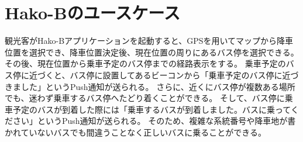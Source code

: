 \documentclass[openany,11pt,papersize]{jsbook}
\begin{document}
\section{Hako-Bのユースケース}
観光客がHako-Bアプリケーションを起動すると、GPSを用いてマップから降車位置を選択でき、降車位置決定後、現在位置の周りにあるバス停を選択できる。
その後、現在位置から乗車予定のバス停までの経路表示をする。
乗車予定のバス停に近づくと、バス停に設置してあるビーコンから「乗車予定のバス停に近づきました」というPush通知が送られる。
さらに、近くにバス停が複数ある場所でも、迷わず乗車するバス停へたどり着くことができる。
そして、バス停に乗車予定のバスが到着した際には「乗車するバスが到着しました。バスに乗ってください」というPush通知が送られる。
そのため、複雑な系統番号や降車地が書かれていないバスでも間違うことなく正しいバスに乗ることができる。

\end{document}
